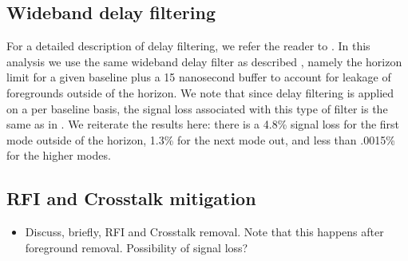 \documentclass[twocolumn,numberedappendix]{emulateapj}
\begin{document}
%
%



\subsection{Wideband delay filtering}

For a detailed description of delay filtering, we refer the reader to
\cite{parsons_backer2009}. In this analysis we use the same wideband delay
filter as described \cite{parsons_et_al2014a}, namely the horizon limit for a
given baseline plus a 15 nanosecond buffer to account for leakage of foregrounds
outside of the horizon. We note that since delay filtering is applied on a per
baseline basis, the signal loss associated with this type of filter is the same
as in \cite{parsons_et_al2014a}. We reiterate the results here: there is a 4.8\%
signal loss for the first mode outside of the horizon, 1.3\% for the next mode
out, and less than .0015\% for the higher modes.


\subsection{RFI and Crosstalk mitigation}
\begin{itemize}
    \item{Discuss, briefly, RFI and Crosstalk removal. Note that this happens
after foreground removal. Possibility of signal loss?}
\end{itemize}
\end{document}
